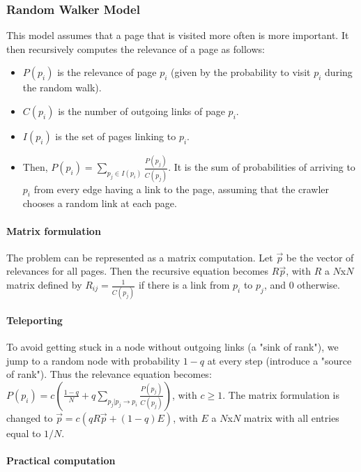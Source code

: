 \subsubsection{Random Walker Model}

This model assumes that a page that is visited more often is more important. It then recursively computes the relevance of a page as follows:
\begin{itemize}
\item $P(p_i)$ is the relevance of page $p_i$ (given by the probability to visit $p_i$ during the random walk).
\item $C(p_i)$ is the number of outgoing links of page $p_i$.
\item $I(p_i)$ is the set of pages linking to $p_i$.
\item Then, $P(p_i) = \sum_{p_j \in I(p_i)} \frac{P(p_j)}{C(p_j)}$. It is the sum of probabilities of arriving to $p_i$ from every edge having a link to the page, assuming that the crawler chooses a random link at each page.
\end{itemize}

\paragraph{Matrix formulation}

The problem can be represented as a matrix computation. Let $\vec{p}$ be the vector of relevances for all pages. Then the recursive equation becomes $R\vec{p}$, with $R$ a $N$x$N$ matrix defined by $R_{ij} = \frac{1}{C(p_j)}$ if there is a link from $p_i$ to $p_j$, and $0$ otherwise.

\paragraph{Teleporting}

To avoid getting stuck in a node without outgoing links (a "sink of rank"), we jump to a random node with probability $1-q$ at every step (introduce a "source of rank"). Thus the relevance equation becomes:
$P(p_i) = c(\frac{1-q}{N} + q \sum_{p_j|p_j \rightarrow p_i} \frac{P(p_j)}{C(p_j)})$, with $c \geq 1$.
The matrix formulation is changed to $\vec{p} = c(qR\vec{p} + (1-q)E)$, with $E$ a $N$x$N$ matrix with all entries equal to $1/N$.

\paragraph{Practical computation}

